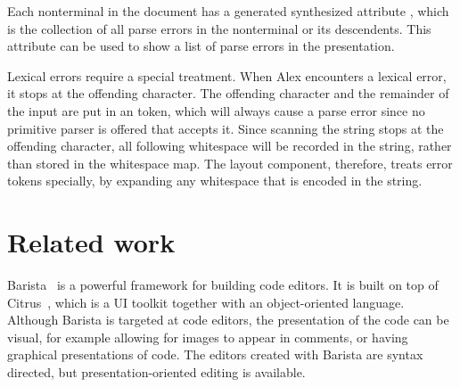\documentclass[12pt]{article}
\begin{document}
Each nonterminal in the document has a generated synthesized attribute , which is the collection of all parse errors in the nonterminal or its descendents. This attribute can be used to show a list of parse errors in the presentation. 


Lexical errors require a special treatment. When Alex encounters a lexical error, it stops at the offending character. The offending character and the remainder of the input are put in an  token, which will always cause a parse error since no primitive parser is offered that accepts it. Since scanning the string stops at the offending character, all following whitespace  will be recorded in the string, rather than stored in the whitespace map. The layout component, therefore, treats error tokens specially, by expanding any whitespace that is encoded in the string. %

%
\section{Related work}\label{sect:relatedWork}
%

\bc
{}





\noindent Barista~\cite{KoMyers06Barista} is a powerful framework for building code editors. It is built on top of Citrus~\cite{KoMyers05Citrus}, which is a UI toolkit together with an object-oriented language. Although Barista is targeted at code editors, the presentation of the code can be visual, for example allowing for images to appear in comments, or having graphical presentations of code. The editors created with Barista are syntax directed, but presentation-oriented editing is available. 
\end{document}
